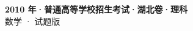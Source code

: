 \documentclass[zihao=-4, a4paper]{ctexart}
\begin{document}
\begin{center}
  {\Large\bfseries 2010 年·普通高等学校招生考试·湖北卷·理科}\\[4pt]
  {\large 数学 · 试题版}
\end{center}
\medskip
{}

\end{document}
